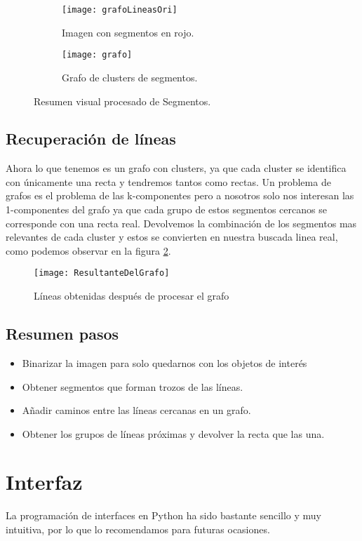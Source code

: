\begin{figure}
\begin{subfigure}[b]{.5\linewidth}
\centering\large \texttt{[image: grafoLineasOri]}
\caption{Imagen con segmentos en rojo.}
\end{subfigure}
\begin{subfigure}[b]{.5\linewidth}
\centering\large \texttt{[image: grafo]}
\caption{Grafo de clusters de segmentos.}
\end{subfigure}
\caption{Resumen visual procesado de Segmentos.}\label{fig:5.6}
\end{figure}

\subsection{Recuperación de líneas}
Ahora lo que tenemos es un grafo con clusters, ya que cada cluster se identifica con únicamente una recta y tendremos tantos como rectas.
Un problema de grafos es el problema de las k-componentes pero a nosotros solo nos interesan las 1-componentes del grafo ya que cada grupo de estos segmentos cercanos se corresponde con una recta real.
Devolvemos la combinación de los segmentos mas relevantes de cada cluster y estos se convierten en nuestra buscada linea real, como podemos observar en la figura \ref{fig:5.7}.
\begin{figure}[h]
\centering
\texttt{[image: ResultanteDelGrafo]}
\caption{Líneas obtenidas después de procesar el grafo}
\label{fig:5.7}
\end{figure}

\subsection{Resumen pasos}

\begin{itemize}
\item Binarizar la imagen para solo quedarnos con los objetos de interés
\item Obtener segmentos que forman trozos de las líneas.
\item Añadir caminos entre las líneas cercanas en un grafo.
\item Obtener los grupos de líneas próximas y devolver la recta que las una. 
\end{itemize}

\section{Interfaz}
La programación de interfaces en Python ha sido bastante sencillo y muy intuitiva, por lo que lo recomendamos para futuras ocasiones.

